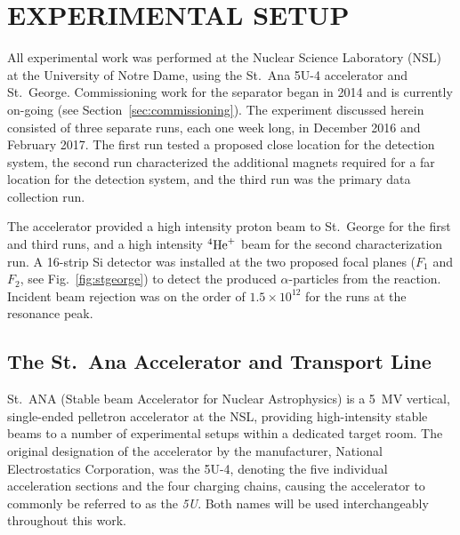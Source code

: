 
\chapter{EXPERIMENTAL SETUP}
\label{ch:02-experimental-setup}

All experimental work was performed at the Nuclear Science Laboratory
(NSL) at the University of Notre Dame, using the St.\ Ana 5U-4
accelerator and St.\ George. Commissioning work for the separator began
in 2014 and is currently on-going (see Section~\ref{sec:commissioning}).
The experiment discussed herein consisted of three separate runs, each
one week long, in December 2016 and February 2017. The first run tested
a proposed close location for the detection system, the second run
characterized the additional magnets required for a far location for the
detection system, and the third run was the primary data collection run.

The accelerator provided a high intensity proton beam to St.\ George for
the first and third runs, and a high intensity ${}^{4}\textrm{He}^{+}$ beam
for the second characterization run. A 16-strip Si detector was
installed at the two proposed focal planes ($F_1$ and $F_2$, see
Fig.~\ref{fig:stgeorge}) to detect the produced $\alpha$-particles from
the \alpa{} reaction. Incident beam rejection was on the order of
$1.5\times 10^{12}$ for the runs at the resonance peak.


\section{The St.\ Ana Accelerator and Transport Line}
\label{sec:ch02-5U}

St.\ ANA (Stable beam Accelerator for Nuclear Astrophysics) is a 5~MV
vertical, single-ended pelletron accelerator at the NSL, providing
high-intensity stable beams to a number of experimental setups within a
dedicated target room. The original designation of the accelerator by
the manufacturer, National Electrostatics Corporation, was the 5U-4,
denoting the five individual acceleration sections and the four charging
chains, causing the accelerator to commonly be referred to as the
\textit{5U}. Both names will be used interchangeably throughout this
work.

